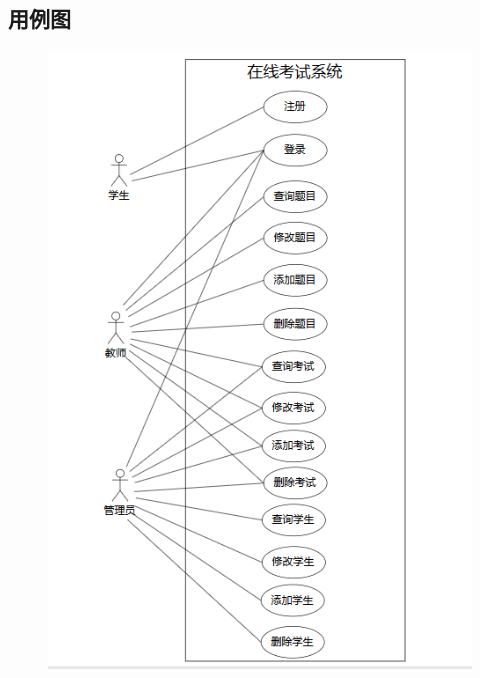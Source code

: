 \documentclass{article}
\begin{document}
\subsection{用例图}
\begin{figure}[H]
    \centering
    \includegraphics[width=0.85\linewidth]{use-case diagram.png}
\end{figure}
\end{document}
